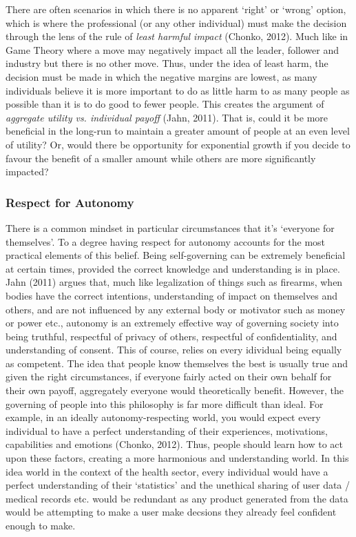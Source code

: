 \documentclass[11pt, english]{article}
\begin{document}
	There are often scenarios in which there is no apparent `right' or `wrong' option, which is where the professional (or any other individual) must make the decision through the lens of the rule of \textit{least harmful impact} (Chonko, 2012). Much like in Game Theory where a move may negatively impact all the leader, follower and industry but there is no other move. Thus, under the idea of least harm, the decision must be made in which the negative margins are lowest, as many individuals believe it is more important to do as little harm to as many people as possible than it is to do good to fewer people. This creates the argument of \textit{aggregate utility vs. individual payoff} (Jahn, 2011). That is, could it be more beneficial in the long-run to maintain a greater amount of people at an even level of utility? Or, would there be opportunity for exponential growth if you decide to favour the benefit of a smaller amount while others are more significantly impacted?

		\subsubsection{Respect for Autonomy}

	There is a common mindset in particular circumstances that it's `everyone for themselves'. To a degree having respect for autonomy accounts for the most practical elements of this belief. Being self-governing can be extremely beneficial at certain times, provided the correct knowledge and understanding is in place. Jahn (2011) argues that, much like legalization of things such as firearms, when bodies have the correct intentions, understanding of impact on themselves and others, and are not influenced by any external body or motivator such as money or power etc., autonomy is an extremely effective way of governing society into being truthful, respectful of privacy of others, respectful of confidentiality, and understanding of consent. This of course, relies on every idividual being equally as competent. The idea that people know themselves the best is usually true and given the right circumstances, if everyone fairly acted on their own behalf for their own payoff, aggregately everyone would theoretically benefit. However, the governing of people into this philosophy is far more difficult than ideal. For example, in an ideally autonomy-respecting world, you would expect every individual to have a perfect understanding of their experiences, motivations, capabilities and emotions (Chonko, 2012). Thus, people should learn how to act upon these factors, creating a more harmonious and understanding world. In this idea world in the context of the health sector, every individual would have a perfect understanding of their `statistics' and the unethical sharing of user data / medical records etc. would be redundant as any product generated from the data would be attempting to make a user make decsions they already feel confident enough to make.
\end{document}
